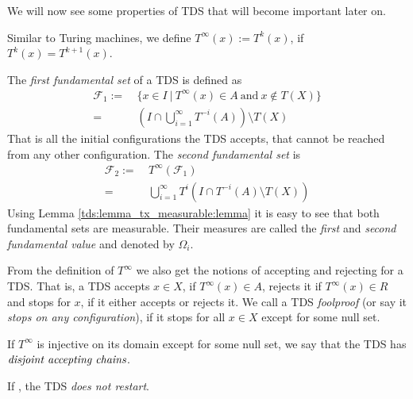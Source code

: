 We will now see some properties of TDS that will become important later on.

Similar to Turing machines, we define $T^\infty(x):=T^k(x)$, if $T^k(x)=T^{k+1}(x)$.

The \emph{first fundamental set} of a TDS is defined as
\begin{align*}
	\mathcal{F}_1 :=&~\{ x \in I~|~T^\infty(x) \in A~\text{and}~x \notin T(X) \} \\
	=&~(I \cap \bigcup_{i=1}^\infty T^{-i}(A)) \setminus T(X)
\end{align*}
That is all the initial configurations the TDS accepts, that cannot be reached from any other configuration.
The \emph{second fundamental set} is
\begin{align*}
	\mathcal{F}_2 :=&~T^\infty(\mathcal{F}_1) \\
	=&~\bigcup_{i=1}^\infty T^i( I \cap T^{-i}(A) \setminus T(X))
\end{align*}
Using Lemma \ref{tds:lemma_tx_measurable:lemma} it is easy to see that both fundamental sets are measurable.
Their measures are called the \emph{first} and \emph{second fundamental value} and denoted by $\Omega_i$.

From the definition of $T^\infty$ we also get the notions of accepting and rejecting for a TDS.
That is, a TDS accepts $x \in X$, if $T^\infty(x) \in A$,
rejects it if $T^\infty(x) \in R$ 
and stops for $x$, if it either accepts or rejects it.
We call a TDS \emph{foolproof} (or say it \emph{stops on any configuration}), if it stops for all $x \in X$ except for some null set.

If $T^\infty$ is injective on its domain except for some null set, we say that the TDS has $\emph{disjoint accepting chains}$.

If , the TDS \emph{does not restart}.
